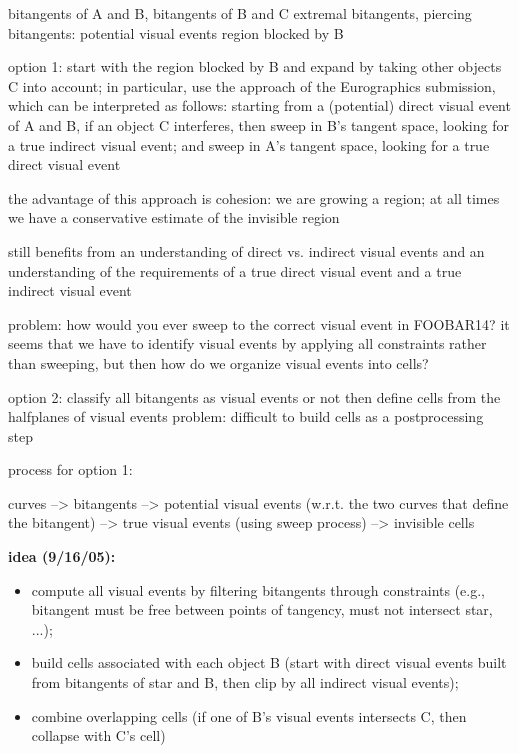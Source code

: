 \documentclass[12pt]{article}
\begin{document}
bitangents of A and B, bitangents of B and C
extremal bitangents, piercing bitangents: potential visual events
region blocked by B

option 1: start with the region blocked by B and expand by taking other objects C 
          into account; in particular, use the approach of the Eurographics submission,
	  which can be interpreted as follows:
	  starting from a (potential) direct visual event of A and B,
	  if an object C interferes, then sweep in B's tangent space, looking for
	  a true indirect visual event; and sweep in A's tangent space, looking for
	  a true direct visual event

	  the advantage of this approach is cohesion: we are growing a region;
	  at all times we have a conservative estimate of the invisible region

	  still benefits from an understanding of direct vs. indirect visual events
	  and an understanding of the requirements of a true direct visual event
	  and a true indirect visual event

	  problem: how would you ever sweep to the correct visual event in FOOBAR14?
	  it seems that we have to identify visual events by applying all constraints
	  rather than sweeping, but then how do we organize visual events into cells?

option 2: classify all bitangents as visual events or not
          then define cells from the halfplanes of visual events
	  problem: difficult to build cells as a postprocessing step

process for option 1:

curves -->
bitangents -->
potential visual events (w.r.t. the two curves that define the bitangent) -->
true visual events (using sweep process) -->
invisible cells

\clearpage

{\bf 
idea (9/16/05):
\begin{itemize}
\item
compute all visual events by filtering bitangents through constraints
  (e.g., bitangent must be free between points of tangency, must not intersect star, ...);
\item
build cells associated with each object B (start with direct visual events built from
  bitangents of star and B, then clip by all indirect visual events);
\item
combine overlapping cells (if one of B's visual events intersects C, then collapse with
  C's cell)
\end{itemize}
}
\end{document}
